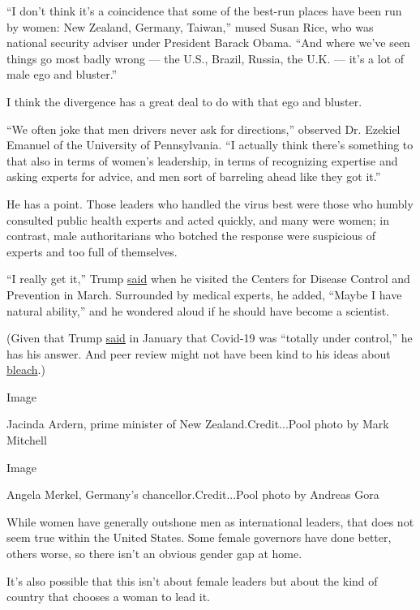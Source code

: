 ``I don't think it's a coincidence that some of the best-run places have
been run by women: New Zealand, Germany, Taiwan,'' mused Susan Rice, who
was national security adviser under President Barack Obama. ``And where
we've seen things go most badly wrong --- the U.S., Brazil, Russia, the
U.K. --- it's a lot of male ego and bluster.''

I think the divergence has a great deal to do with that ego and bluster.

``We often joke that men drivers never ask for directions,'' observed
Dr. Ezekiel Emanuel of the University of Pennsylvania. ``I actually
think there's something to that also in terms of women's leadership, in
terms of recognizing expertise and asking experts for advice, and men
sort of barreling ahead like they got it.''

He has a point. Those leaders who handled the virus best were those who
humbly consulted public health experts and acted quickly, and many were
women; in contrast, male authoritarians who botched the response were
suspicious of experts and too full of themselves.

``I really get it,'' Trump
\href{https://www.whitehouse.gov/briefings-statements/remarks-president-trump-tour-centers-disease-control-prevention-atlanta-ga/}{said}
when he visited the Centers for Disease Control and Prevention in March.
Surrounded by medical experts, he added, ``Maybe I have natural
ability,'' and he wondered aloud if he should have become a scientist.

(Given that Trump
\href{https://www.nytimes.com/2020/03/15/opinion/trump-coronavirus.html}{said}
in January that Covid-19 was ``totally under control,'' he has his
answer. And peer review might not have been kind to his ideas about
\href{https://www.nytimes.com/2020/04/24/us/politics/trump-inject-disinfectant-bleach-coronavirus.html}{bleach}.)

Image

Jacinda Ardern, prime minister of New Zealand.Credit...Pool photo by
Mark Mitchell

Image

Angela Merkel, Germany's chancellor.Credit...Pool photo by Andreas Gora

While women have generally outshone men as international leaders, that
does not seem true within the United States. Some female governors have
done better, others worse, so there isn't an obvious gender gap at home.

It's also possible that this isn't about female leaders but about the
kind of country that chooses a woman to lead it.

